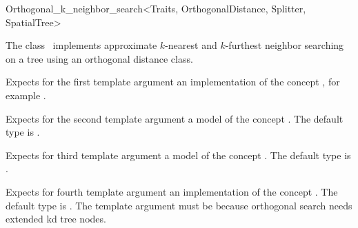 

\begin{ccRefClass}{Orthogonal_k_neighbor_search<Traits, OrthogonalDistance, Splitter, SpatialTree>}


\ccDefinition

The class \ccRefName\ implements approximate $k$-nearest and
$k$-furthest neighbor searching  on a tree
using an orthogonal distance class.


\ccParameters

Expects for the first template argument an implementation of the concept ,
for example .

Expects for the second template argument a model of the
concept . The default type is 
.

Expects for third template argument a model of the concept .
The default type is .

Expects for fourth template argument an implementation of the concept .
The default type is .  The 
template argument must be  because orthogonal search needs extended 
kd tree nodes.

\ccTypes




\end{ccRefClass}
